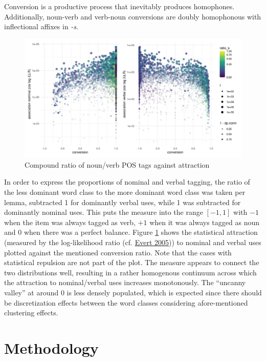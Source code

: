 \documentclass[
]{article}
\begin{document}
Conversion is a productive process that inevitably produces homophones.
Additionally, noun-verb and verb-noun conversions are doubly homophonous
with inflectional affixes in \emph{-s}.

\begin{figure}[t!]
   \centering
   \includegraphics[width=\textwidth]{figures/continuum.jpg}
   \caption{Compound ratio of noun/verb POS tags against attraction}
   \label{continuum}
\end{figure}

In order to express the proportions of nominal and verbal tagging, the
ratio of the less dominant word class to the more dominant word class
was taken per lemma, subtracted 1 for dominantly verbal uses, while 1
was subtracted for dominantly nominal uses. This puts the measure into
the range \([-1, 1]\) with \(-1\) when the item was always tagged as
verb, \(+1\) when it was always tagged as noun and 0 when there was a
perfect balance. Figure \ref{continuum} shows the statistical attraction
(measured by the log-likelihood ratio (cf.
\protect\hyperlink{ref-evert05}{Evert 2005})) to nominal and verbal uses
plotted against the mentioned conversion ratio. Note that the cases with
statistical repulsion are not part of the plot. The measure appears to
connect the two distributions well, resulting in a rather homogenous
continuum across which the attraction to nominal/verbal uses increases
monotonously. The ``uncanny valley'' at around 0 is less densely
populated, which is expected since there should be discretization
effects between the word classes considering afore-mentioned clustering
effects.

\hypertarget{meth}{%
\section{Methodology}\label{meth}}
\end{document}
